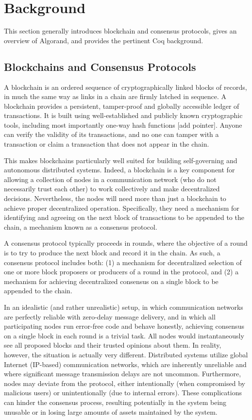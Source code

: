 \section{Background}
\label{sec:background}
This section generally introduces blockchain and consensus protocols, gives an overview of Algorand, and provides the pertinent Coq background.

\subsection{Blockchains and Consensus Protocols}

A blockchain is an ordered sequence of cryptographically linked blocks of records, in much the same way as links in a chain are firmly latched in sequence. A blockchain provides a persistent, tamper-proof and globally accessible ledger of transactions. It is built using well-established and publicly known cryptographic tools, including most importantly one-way hash functions [add pointer]. Anyone can verify the validity of its transactions, and no one can tamper with a transaction or claim a transaction that does not appear in the chain. 

This makes blockchains particularly well suited for building self-governing and autonomous distributed systems. Indeed, a blockchain is a key component for allowing a collection of nodes in a communication network (who do not necessarily trust each other) to work collectively and make decentralized decisions. Nevertheless, the nodes will need more than just a blockchain to achieve proper decentralized operation. Specifically, they need a mechanism for identifying and agreeing on the next block of transactions to be appended to the chain, a mechanism known as a consensus protocol.

A consensus protocol typically proceeds in rounds, where the objective of a round is to try to produce the next block and record it in the chain. As such, a consensus protocol includes both: 
(1) a mechanism for decentralized selection of one or more block proposers or producers of a round in the protocol, and 
(2) a mechanism for achieving decentralized consensus on a single block to be appended to the chain. 

In an idealistic (and rather unrealistic) setup, in which communication networks are perfectly reliable with zero-delay message delivery, and in which all participating nodes run error-free code and behave honestly, achieving consensus on a single block in each round is a trivial task. All nodes would instantaneously see all proposed blocks and their trusted opinions about them. In reality, however, the situation is actually very different. Distributed systems utilize global Internet (IP-based) communication networks, which are inherently unreliable and where significant message transmission delays are not uncommon. Furthermore, nodes may deviate from the protocol, either intentionally (when compromised by malicious users) or unintentionally (due to internal errors). These complications can hinder the consensus process, resulting potentially in the system being unusable or in losing large amounts of assets maintained by the system.

